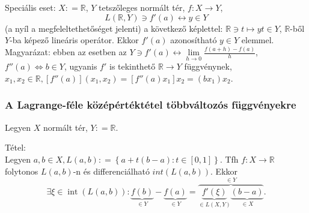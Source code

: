 \documentclass[12pt,a4paper]{scrartcl}
\newenvironment{tetel}{}{}
\begin{document}
Speciális eset: \(X: = {\mathbb{R}}\), \(Y\) tetszőleges normált tér,
\(\left. f:X\rightarrow Y \right.\),
\[\left. L\left( {{\mathbb{R}},Y} \right) \ni f'\left( a \right)\leftrightarrow y \in Y \right.\]
(a nyíl a megfeleltethetőséget jelenti) a következő képlettel:
\(\left. {\mathbb{R}} \ni t\mapsto yt \in Y \right.\),
\(\mathbb{R}\)-ből \(Y\)-ba képező lineáris operátor. Ekkor
\(f'\left( a \right)\) azonosítható \(y \in Y\) elemmel.\\
Magyarázat: ebben az esetben az
\(\left. Y \ni f'\left( a \right)\leftrightarrow\underset{h\rightarrow 0}{\lim}\frac{f\left( {a + h} \right) - f\left( a \right)}{h} \right.\),
\(\left. f''\left( a \right)\Leftrightarrow b \in Y \right.\), ugyanis
\(f'\) is tekinthető \(\left. {\mathbb{R}}\rightarrow Y \right.\)
függvénynek,
\(x_{1},x_{2} \in {\mathbb{R}},\left\lbrack {f''\left( a \right)} \right\rbrack\left( {x_{1},x_{2}} \right) = \left\lbrack {f''\left( a \right)x_{1}} \right\rbrack x_{2} = \left( {bx_{1}} \right)x_{2}\).

\hypertarget{a-lagrange-fele-kozepertektetel-tobbvaltozos-fuggvenyekre}{%
\subsubsection{A Lagrange-féle középértéktétel többváltozós
függvényekre}\label{a-lagrange-fele-kozepertektetel-tobbvaltozos-fuggvenyekre}}

Legyen \(X\) normált tér, \(Y: = {\mathbb{R}}\).

\begin{tetel}

Tétel:\\
Legyen
\(a,b \in X,L\left( {a,b} \right): = \left\{ {a + t\left( {b - a} \right):t \in \left\lbrack 0,1 \right\rbrack} \right\}\).
Tfh \(\left. f:X\rightarrow{\mathbb{R}} \right.\) folytonos
\(L\left( {a,b} \right)\)-n és differenciálható
\({int}\left( {L\left( {a,b} \right)} \right)\). Ekkor
\[\exists \xi  \in \operatorname{int} \left( {L\left( {a,b} \right)} \right):\underbrace {f\left( b \right)}_{ \in Y} - \underbrace {f\left( a \right)}_{ \in Y} = \overbrace {\underbrace {f'\left( \xi  \right)}_{ \in L\left( {X,Y} \right)}\underbrace {\left( {b - a} \right)}_{ \in X}}^{ \in Y}.\]

\end{tetel}
\end{document}

